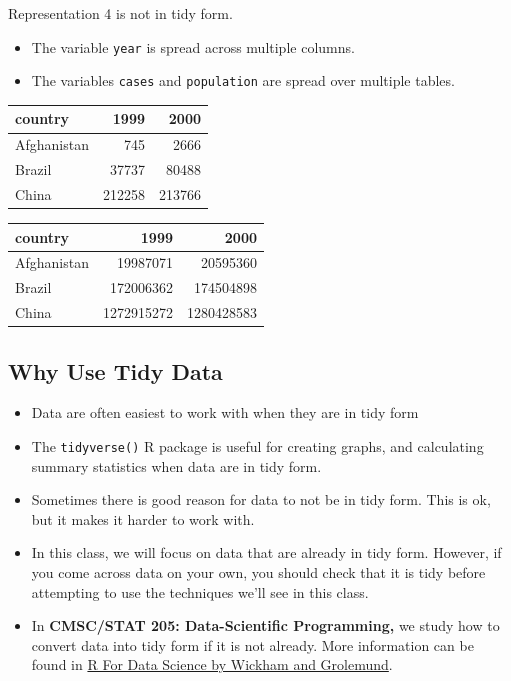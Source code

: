 \documentclass[]{book}
\providecommand{\tightlist}{%
  \setlength{\itemsep}{0pt}\setlength{\parskip}{0pt}}
\begin{document}
Representation 4 is not in tidy form.

\begin{itemize}
\tightlist
\item
  The variable \texttt{year} is spread across multiple columns.\\
\item
  The variables \texttt{cases} and \texttt{population} are spread over
  multiple tables.
\end{itemize}

\begin{tabular}{l|r|r}
\hline
country & 1999 & 2000\\
\hline
Afghanistan & 745 & 2666\\
\hline
Brazil & 37737 & 80488\\
\hline
China & 212258 & 213766\\
\hline
\end{tabular}

\begin{tabular}{l|r|r}
\hline
country & 1999 & 2000\\
\hline
Afghanistan & 19987071 & 20595360\\
\hline
Brazil & 172006362 & 174504898\\
\hline
China & 1272915272 & 1280428583\\
\hline
\end{tabular}

\subsection{Why Use Tidy Data}\label{why-use-tidy-data}

\begin{itemize}
\item
  Data are often easiest to work with when they are in tidy form
\item
  The \texttt{tidyverse()} R package is useful for creating graphs, and
  calculating summary statistics when data are in tidy form.
\item
  Sometimes there is good reason for data to not be in tidy form. This
  is ok, but it makes it harder to work with.
\item
  In this class, we will focus on data that are already in tidy form.
  However, if you come across data on your own, you should check that it
  is tidy before attempting to use the techniques we'll see in this
  class.
\item
  In \textbf{CMSC/STAT 205: Data-Scientific Programming,} we study how
  to convert data into tidy form if it is not already. More information
  can be found in \href{https://r4ds.had.co.nz/tidy-data.html}{R For
  Data Science by Wickham and Grolemund}.
\end{itemize}
\end{document}
